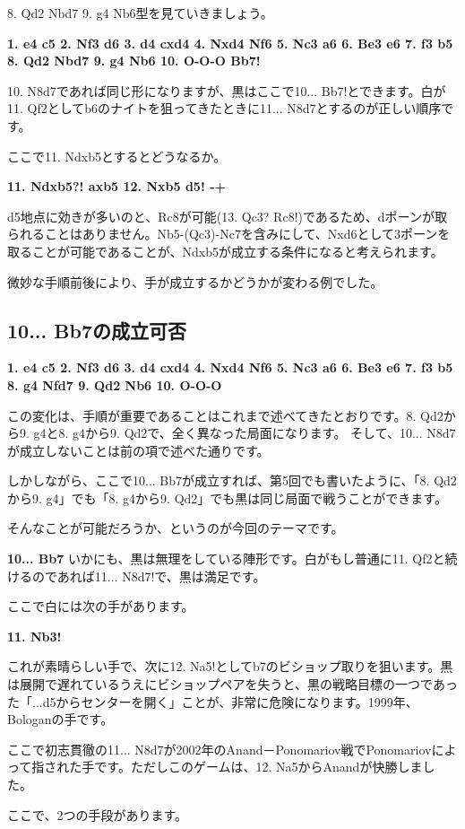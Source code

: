 8. Qd2 Nbd7 9. g4 Nb6型を見ていきましょう。

{\bf 1. e4 c5 2. Nf3 d6 3. d4 cxd4 4. Nxd4 Nf6 5. Nc3 a6 6. Be3 e6 7. f3 b5 8. Qd2 Nbd7 9. g4 Nb6 10. O-O-O Bb7!}

10. N8d7であれば同じ形になりますが、黒はここで10... Bb7!とできます。白が11. Qf2としてb6のナイトを狙ってきたときに11... N8d7とするのが正しい順序です。

ここで11. Ndxb5とするとどうなるか。

{\bf 11. Ndxb5?! axb5 12. Nxb5 d5! -+}

d5地点に効きが多いのと、Rc8が可能(13. Qc3? Rc8!)であるため、dポーンが取られることはありません。Nb5-(Qc3)-Nc7を含みにして、Nxd6として3ポーンを取ることが可能であることが、Ndxb5が成立する条件になると考えられます。

微妙な手順前後により、手が成立するかどうかが変わる例でした。

\subsection{10... Bb7の成立可否}
{\bf 1. e4 c5 2. Nf3 d6 3. d4 cxd4 4. Nxd4 Nf6 5. Nc3 a6 6. Be3 e6 7. f3 b5 8. g4 Nfd7 9. Qd2 Nb6 10. O-O-O}

この変化は、手順が重要であることはこれまで述べてきたとおりです。8. Qd2から9. g4と8. g4から9. Qd2で、全く異なった局面になります。
そして、10... N8d7が成立しないことは前の項で述べた通りです。

しかしながら、ここで10... Bb7が成立すれば、第5回でも書いたように、「8. Qd2から9. g4」でも「8. g4から9. Qd2」でも黒は同じ局面で戦うことができます。

そんなことが可能だろうか、というのが今回のテーマです。

{\bf 10... Bb7}
いかにも、黒は無理をしている陣形です。白がもし普通に11. Qf2と続けるのであれば11... N8d7!で、黒は満足です。

ここで白には次の手があります。

{\bf 11. Nb3!}

これが素晴らしい手で、次に12. Na5!としてb7のビショップ取りを狙います。黒は展開で遅れているうえにビショップペアを失うと、黒の戦略目標の一つであった「...d5からセンターを開く」ことが、非常に危険になります。1999年、Bologanの手です。

ここで初志貫徹の11... N8d7が2002年のAnand－Ponomariov戦でPonomariovによって指された手です。ただしこのゲームは、12. Na5からAnandが快勝しました。

ここで、2つの手段があります。

